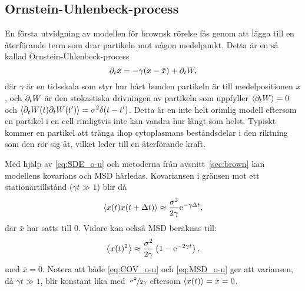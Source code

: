 

\subsection{Ornstein-Uhlenbeck-process}
En första utvidgning av modellen för brownsk rörelse fås genom att lägga till en återförande term som drar partikeln mot någon medelpunkt. Detta är en så kallad Ornstein-Uhlenbeck-process
\begin{equation}\label{eq:SDE_o-u}
\partial_t x = -\gamma ( x-\bar{x} ) + \partial_t W,
\end{equation}
där $\gamma$ är en tidsskala som styr hur hårt bunden partikeln är till medelpositionen $\bar{x}$, och $\partial_t W$ är den stokastiska drivningen av partikeln som uppfyller $\ev{\pd_t W}=0$ och $\ev{\pd_t W(t)\pd_t W(t')} = \sigma^2\delta(t-t')$. Detta är en inte helt orimlig modell eftersom en partikel i en cell rimligtvis inte kan vandra hur långt som helst. Typiskt kommer en partikel att tränga ihop cytoplasmans beståndsdelar i den riktning som den rör sig åt, vilket leder till en återförande kraft.

Med hjälp av \eqref{eq:SDE_o-u} och metoderna från avsnitt~\ref{sec:brown} kan modellens kovarians och MSD härledas. Kovariansen i gränsen mot ett stationärtillstånd ($\gamma t\gg 1$) blir då
\begin{equation}\label{eq:COV_o-u}
\ev{x(t)x(t+\Delta{t})} \approx \frac{\sigma^2}{2\gamma} \ee^{-\gamma\Delta{t}},
\end{equation}
där $\bar{x}$ har satts till 0. Vidare kan också MSD beräknas till:
\begin{equation}\label{eq:MSD_o-u}
\ev{x(t)^2} 
\approx \frac{\sigma^2}{2\gamma} \left( 1-\ee^{-2\gamma t} \right),
\end{equation}
med $\bar{x}=0$. Notera att både \eqref{eq:COV_o-u} och \eqref{eq:MSD_o-u} ger att variansen, då $\gamma t\gg 1$, blir konstant lika med~$\nicefrac{\sigma^2}{2\gamma}$ eftersom $\ev{x(t)}=\bar{x}=0$.


